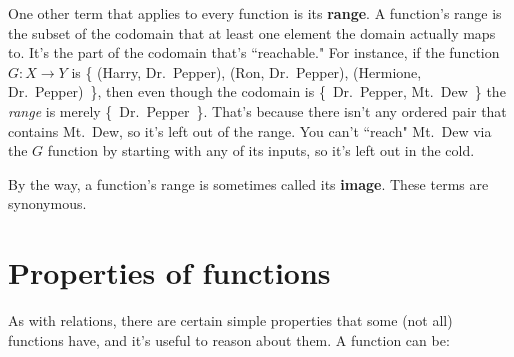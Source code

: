 One other term that applies to every function is its \textbf{range}. A
function's range is the subset of the codomain that at least one element
the domain actually maps to. It's the part of the codomain that's
``reachable." For instance, if the function $G : X \rightarrow Y$ is \{
(Harry, Dr.~Pepper), (Ron, Dr.~Pepper), (Hermione, Dr.~Pepper)~\}, then
even though the codomain is \{~Dr.~Pepper, Mt.~Dew~\} the \textit{range} is
merely \{~Dr.~Pepper~\}.  That's because there isn't any ordered pair that
contains Mt.~Dew, so it's left out of the range. You can't ``reach" Mt.~Dew
via the $G$ function by starting with any of its inputs, so it's left out
in the cold.

By the way, a function's range is sometimes called its \textbf{image}.
These terms are synonymous.


\section{Properties of functions}

As with relations, there are certain simple properties that some (not all)
functions have, and it's useful to reason about them. A function can be:

